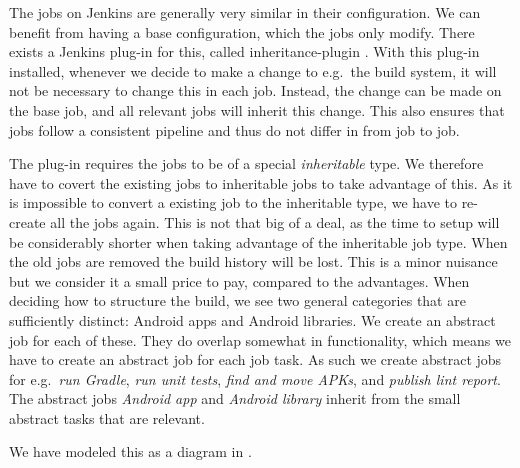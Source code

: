 The jobs on Jenkins are generally very similar in their configuration. We can benefit from having a base configuration, which the jobs only modify. There exists a Jenkins plug-in for this, called inheritance-plugin \parencite{jenkins-inheritance}. With this plug-in installed, whenever we decide to make a change to e.g.\ the build system, it will not be necessary to change this in each job. Instead, the change can be made on the base job, and all relevant jobs will inherit this change. This also ensures that jobs follow a consistent pipeline and thus do not differ in from job to job.

The plug-in requires the jobs to be of a special \emph{inheritable} type. We therefore have to covert the existing jobs to inheritable jobs to take advantage of this. As it is impossible to convert a existing job to the inheritable type, we have to re-create all the jobs again. This is not that big of a deal, as the time to setup will be considerably shorter when taking advantage of the inheritable job type. When the old jobs are removed the build history will be lost. This is a minor nuisance but we consider it a small price to pay, compared to the advantages. When deciding how to structure the build, we see two general categories that are sufficiently distinct: Android apps and Android libraries. We create an abstract job for each of these. They do overlap somewhat in functionality, which means we have to create an abstract job for each job task. As such we create abstract jobs for e.g.\ \emph{run Gradle}, \emph{run unit tests}, \emph{find and move APKs}, and \emph{publish lint report}. The abstract jobs \emph{Android app} and \emph{Android library} inherit from the small abstract tasks that are relevant.

We have modeled this as a diagram in .

